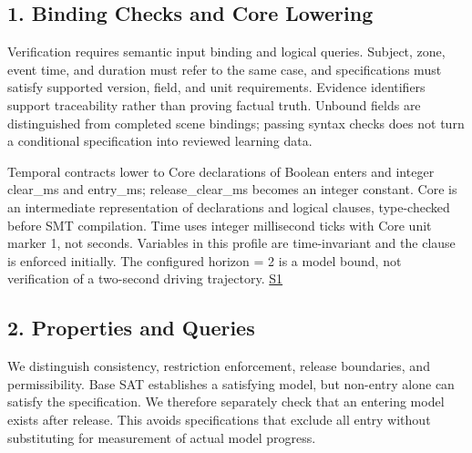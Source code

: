 \documentclass[11pt,a4paper]{article}
\begin{document}
\subsection*{1. Binding Checks and Core Lowering}

Verification requires semantic input binding and logical queries. Subject, zone, event time, and duration must refer to the same case, and specifications must satisfy supported version, field, and unit requirements. Evidence identifiers support traceability rather than proving factual truth. Unbound fields are distinguished from completed scene bindings; passing syntax checks does not turn a conditional specification into reviewed learning data.\par

Temporal contracts lower to Core declarations of Boolean {\ttfamily\small enters} and integer {\ttfamily\small clear\_\allowbreak{}ms} and {\ttfamily\small entry\_\allowbreak{}ms}; {\ttfamily\small release\_\allowbreak{}clear\_\allowbreak{}ms} becomes an integer constant. Core is an intermediate representation of declarations and logical clauses, type-checked before SMT compilation. Time uses integer millisecond ticks with Core unit marker {\ttfamily\small 1}, not seconds. Variables in this profile are time-invariant and the clause is enforced initially. The configured {\ttfamily\small horizon = 2} is a model bound, not verification of a two-second driving trajectory. \href{\detokenize{../../../../../../projects/04-guardsynth-coc/experiments/paper1_cnl_learning/temporal_preservation.py}}{S1}\par

\subsection*{2. Properties and Queries}

We distinguish consistency, restriction enforcement, release boundaries, and permissibility. Base SAT establishes a satisfying model, but non-entry alone can satisfy the specification. We therefore separately check that an entering model exists after release. This avoids specifications that exclude all entry without substituting for measurement of actual model progress.\par
\end{document}
